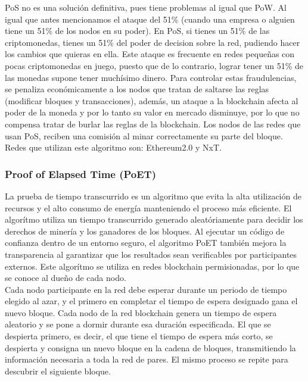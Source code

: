 PoS no es una solución definitiva, pues tiene problemas al igual que PoW. Al igual que antes mencionamos el ataque del 51\% (cuando una empresa o alguien tiene un 51\% de los nodos en su poder). En PoS, si tienes un 51\% de las criptomonedas, tienes un 51\% del poder de decision sobre la red, pudiendo hacer los cambios que quieras en ella. Este ataque es frecuente en redes pequeñas con pocas criptomonedas en juego, puesto que de lo contrario, lograr tener un 51\% de las monedas supone tener muchísimo dinero. Para controlar estas fraudulencias, se penaliza económicamente a los nodos que tratan de saltarse las reglas (modificar bloques y transacciones), además, un ataque a la blockchain afecta al poder de la moneda y por lo tanto su valor en mercado disminuye, por lo que no compensa tratar de burlar las reglas de la blockchain. Los nodos de las redes que usan PoS, reciben una comisión al minar correctamente su parte del bloque. \\

Redes que utilizan este algoritmo son: Ethereum2.0\cite{Ethereum2.0} y NxT\cite{NxT}.

\subsubsection{Proof of Elapsed Time (PoET)}

La prueba de tiempo transcurrido es un algoritmo que evita la alta utilización de recursos y el alto consumo de energía manteniendo el proceso más eficiente. El algorítmo utiliza un tiempo transcurrido generado aleatóriamente para decidir los derechos de minería y los ganadores de los bloques. Al ejecutar un código de confianza dentro de un entorno seguro, el algoritmo PoET también mejora la transparencia al garantizar que los resultados sean verificables por participantes externos. Este algorítmo se utiliza en redes blockchain permisionadas, por lo que se conoce al dueño de cada nodo. \\

Cada nodo participante en la red debe esperar durante un periodo de tiempo elegido al azar, y el primero en completar el tiempo de espera designado gana el nuevo bloque. Cada nodo de la red blockchain genera un tiempo de espera aleatorio y se pone a dormir durante esa duración especificada. El que se despierta primero, es decir, el que tiene el tiempo de espera más corto, se despierta y consigna un nuevo bloque en la cadena de bloques, transmitiendo la información necesaria a toda la red de pares. El mismo proceso se repite para descubrir el siguiente bloque. \\

